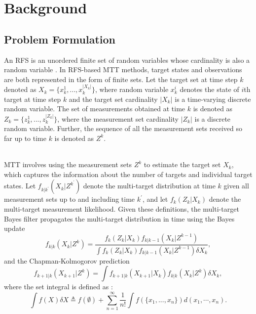 \chapter{Background}

\section{Problem Formulation}
An RFS is an unordered finite set of random variables whose cardinality is also a random variable \cite{rfs}. In RFS-based MTT methods, target states and observations are both represented in the form of finite sets. Let the target set at time step $k$ denoted as $X_k = \{x^1_k,...,x^{|X_k|}_k\}$, where random variable $x^i_k$ denotes the state of $i$th target at time step $k$ and the target set cardinality $|X_k|$ is a time-varying discrete random variable. The set of measurements obtained at time $k$ is denoted as $Z_k = \{z^1_k,...,z^{|Z_k|}_k\}$, where the measurement set cardinality $|Z_k|$ is a discrete random variable. Further, the sequence of all the measurement sets received so far up to time $k$ is denoted as $Z^k$. 

~\\
MTT involves using the measurement sets $Z^k$ to estimate the target set $X_k$, which captures the information about the number of targets and individual target states. Let $f_{k|k^{\prime}} (X_k|Z^{k^{\prime}})$ denote the multi-target distribution at time $k$ given all measurement sets up to and including time $k^{\prime}$, and let $f_k(Z_k|X_k)$ denote the multi-target measurement likelihood. Given these definitions, the multi-target Bayes filter propagates the multi-target distribution in time using the Bayes update \cite[p .484]{rfs}
\begin{equation}
    f_{k|k}(X_k|Z^k) = \frac{f_{k}(Z_k|X_k)f_{k|k-1}(X_k|Z^{k-1})} {\int f_{k}(Z_k|X_k)f_{k|k-1}(X_k|Z^{k-1}) \delta X_k},
    \label{eq:update}
\end{equation}
and the Chapman-Kolmogorov prediction \cite[p .484]{rfs}
\begin{equation}
    f_{k+1|k}(X_{k+1}|Z^k) = \int f_{k+1|k}(X_{k+1}|X_k)f_{k|k}(X_k|Z^k)\delta X_k,
    \label{eq:predict}
\end{equation}
where the set integral is defined as \cite[p .361]{rfs}:
\begin{equation}
    \int f(X)\delta X \triangleq f(\emptyset) + \sum_{n=1}^{\infty}\frac{1}{n!}\int f(\{x_1,...,x_n\})d(x_1,\dotsb,x_n).
    \label{eq:setintegral}
\end{equation}



